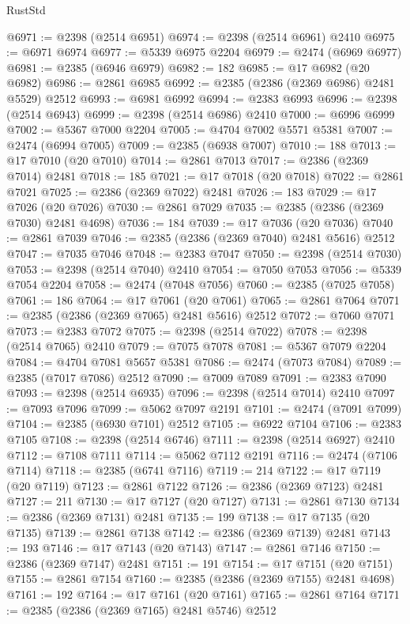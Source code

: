 \begin{lexlean}{RustStd}
\begin{coremodule}
{\begin{coremodule}
{{{{{{{{{{{{{{{{{{{{{{{{{{{{{{{{{{{{{{{{{{{{{{{{{{@6971 := @2398 (@2514 @6951)
@6974 := @2398 (@2514 @6961) @2410
@6975 := @6971 @6974
@6977 := @5339 @6975 @2204
@6979 := @2474 (@6969 @6977)
@6981 := @2385 (@6946 @6979)
@6982 := 182
@6985 := @17 @6982 (@20 @6982)
@6986 := @2861 @6985
@6992 := @2385 (@2386 (@2369 @6986) @2481 @5529) @2512
@6993 := @6981 @6992
@6994 := @2383 @6993
@6996 := @2398 (@2514 @6943)
@6999 := @2398 (@2514 @6986) @2410
@7000 := @6996 @6999
@7002 := @5367 @7000 @2204
@7005 := @4704 @7002 @5571 @5381
@7007 := @2474 (@6994 @7005)
@7009 := @2385 (@6938 @7007)
@7010 := 188
@7013 := @17 @7010 (@20 @7010)
@7014 := @2861 @7013
@7017 := @2386 (@2369 @7014) @2481
@7018 := 185
@7021 := @17 @7018 (@20 @7018)
@7022 := @2861 @7021
@7025 := @2386 (@2369 @7022) @2481
@7026 := 183
@7029 := @17 @7026 (@20 @7026)
@7030 := @2861 @7029
@7035 := @2385 (@2386 (@2369 @7030) @2481 @4698)
@7036 := 184
@7039 := @17 @7036 (@20 @7036)
@7040 := @2861 @7039
@7046 := @2385 (@2386 (@2369 @7040) @2481 @5616) @2512
@7047 := @7035 @7046
@7048 := @2383 @7047
@7050 := @2398 (@2514 @7030)
@7053 := @2398 (@2514 @7040) @2410
@7054 := @7050 @7053
@7056 := @5339 @7054 @2204
@7058 := @2474 (@7048 @7056)
@7060 := @2385 (@7025 @7058)
@7061 := 186
@7064 := @17 @7061 (@20 @7061)
@7065 := @2861 @7064
@7071 := @2385 (@2386 (@2369 @7065) @2481 @5616) @2512
@7072 := @7060 @7071
@7073 := @2383 @7072
@7075 := @2398 (@2514 @7022)
@7078 := @2398 (@2514 @7065) @2410
@7079 := @7075 @7078
@7081 := @5367 @7079 @2204
@7084 := @4704 @7081 @5657 @5381
@7086 := @2474 (@7073 @7084)
@7089 := @2385 (@7017 @7086) @2512
@7090 := @7009 @7089
@7091 := @2383 @7090
@7093 := @2398 (@2514 @6935)
@7096 := @2398 (@2514 @7014) @2410
@7097 := @7093 @7096
@7099 := @5062 @7097 @2191
@7101 := @2474 (@7091 @7099)
@7104 := @2385 (@6930 @7101) @2512
@7105 := @6922 @7104
@7106 := @2383 @7105
@7108 := @2398 (@2514 @6746)
@7111 := @2398 (@2514 @6927) @2410
@7112 := @7108 @7111
@7114 := @5062 @7112 @2191
@7116 := @2474 (@7106 @7114)
@7118 := @2385 (@6741 @7116)
@7119 := 214
@7122 := @17 @7119 (@20 @7119)
@7123 := @2861 @7122
@7126 := @2386 (@2369 @7123) @2481
@7127 := 211
@7130 := @17 @7127 (@20 @7127)
@7131 := @2861 @7130
@7134 := @2386 (@2369 @7131) @2481
@7135 := 199
@7138 := @17 @7135 (@20 @7135)
@7139 := @2861 @7138
@7142 := @2386 (@2369 @7139) @2481
@7143 := 193
@7146 := @17 @7143 (@20 @7143)
@7147 := @2861 @7146
@7150 := @2386 (@2369 @7147) @2481
@7151 := 191
@7154 := @17 @7151 (@20 @7151)
@7155 := @2861 @7154
@7160 := @2385 (@2386 (@2369 @7155) @2481 @4698)
@7161 := 192
@7164 := @17 @7161 (@20 @7161)
@7165 := @2861 @7164
@7171 := @2385 (@2386 (@2369 @7165) @2481 @5746) @2512
}}}}}}}}}}}}}}}}}}}}}}}}}}}}}}}}}}}}}}}}}}}}}}}}}}
\end{coremodule}}
\end{coremodule}
\end{lexlean}
